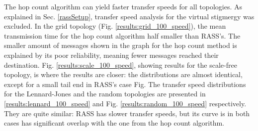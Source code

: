 The hop count algorithm can yield faster transfer speeds for all topologies. As explained in Sec. \ref{rassSetup}, transfer speed analysis for the virtual stigmergy was excluded. In the grid topology (Fig. \ref{results:grid_100_speed}), the mean transmission time for the hop count algorithm half smaller than \ac{RASS}'s. The smaller amount of messages shown in the graph for the hop count method is explained by its poor reliability, meaning fewer messages reached their destination. Fig. \ref{results:scale_100_speed}, showing results for the scale-free topology, is where the results are closer: the distributions are almost identical, except for a small tail end in \ac{RASS}'s case Fig. The transfer speed distributions for the Lennard-Jones and the random topologies are presented in  \ref{results:lennard_100_speed} and Fig. \ref{results:random_100_speed} respectively. They are quite similar: \ac{RASS} has slower transfer speeds, but its curve is in both cases has significant overlap with the one from the hop count algorithm.

